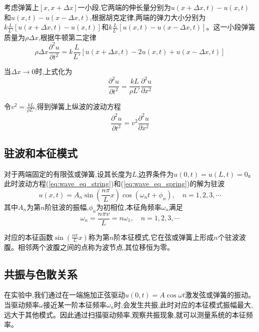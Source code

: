 \documentclass[UTF8]{ctexart}
\begin{document}
考虑弹簧上$[x, x+\Delta x]$一小段,它两端的伸长量分别为$u(x+\Delta x, t)-u(x,t)$和$u(x,t)-u(x-\Delta x,t)$,根据胡克定律,两端的弹力大小分别为$k\frac{L}{L'}[u(x+\Delta x, t)-u(x,t)]$和$k\frac{L}{L'}[u(x,t)-u(x-\Delta x,t)]$。这一小段弹簧质量为$\rho\Delta x$,根据牛顿第二定律
\begin{equation}
\rho\Delta x\frac{\partial^2u}{\partial t^2} = k\frac{L}{L'}\left[u(x+\Delta x, t) - 2u(x,t) + u(x-\Delta x,t)\right]
\end{equation}

当$\Delta x \to 0$时,上式化为
\begin{equation}
\frac{\partial^2u}{\partial t^2} = \frac{kL}{\rho L'}\frac{\partial^2u}{\partial x^2}
\end{equation}

令$v^2 = \frac{kL}{\rho L'}$,得到弹簧上纵波的波动方程
\begin{equation}
\frac{\partial^2u}{\partial t^2} = v^2\frac{\partial^2u}{\partial x^2}
\label{eq:wave_eq_spring}
\end{equation}

\subsection{驻波和本征模式}

对于两端固定的有限弦或弹簧,设其长度为$L$,边界条件为$u(0,t)=u(L,t)=0$。此时波动方程(\ref{eq:wave_eq_string})和(\ref{eq:wave_eq_spring})的解为驻波
\begin{equation}
u(x,t) = A_n \sin(\frac{n\pi}{L}x)\cos(\omega_nt+\phi_n), \quad n=1,2,3,\cdots
\label{eq:standing_wave}
\end{equation}
其中$A_n$为第$n$阶驻波的振幅,$\phi_n$为初相位,本征角频率$\omega_n$满足
\begin{equation}
\omega_n = \frac{n\pi v}{L} = n\omega_1, \quad n=1,2,3,\cdots
\label{eq:eigen_freq}
\end{equation}

对应的本征函数$\sin\left(\frac{n\pi}{L}x\right)$称为第$n$阶本征模式,它在弦或弹簧上形成$n$个驻波波腹。相邻两个波腹之间的点称为波节点,其位移恒为零。

\subsection{共振与色散关系}

在实验中,我们通过在一端施加正弦驱动$u(0,t)=A\cos\omega t$激发弦或弹簧的振动。当驱动频率$\omega$接近某一阶本征频率$\omega_n$时,会发生共振,此时对应的本征模式振幅最大,远大于其他模式。因此通过扫描驱动频率,观察共振现象,就可以测量系统的本征频率。
\end{document}
